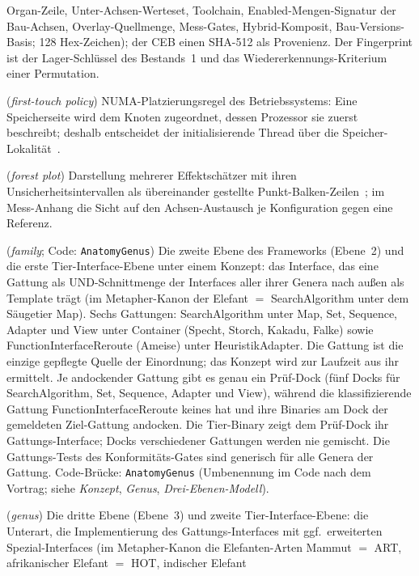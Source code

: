 \begin{description}
  Organ-Zeile, Unter-Achsen-Werteset, Toolchain, Enabled-Mengen-Signatur der Bau-Achsen,
  Overlay-Quellmenge, Mess-Gates, Hybrid-Komposit, Bau-Versions-Basis; 128 Hex-Zeichen); der CEB
  einen SHA-512 als Provenienz. Der Fingerprint ist der Lager-Schlüssel des Bestands~1 und das
  Wiedererkennungs-Kriterium einer Permutation.
  \item[First-Touch] (\emph{first-touch policy}) NUMA-Platzierungsregel des Betriebssystems: Eine
  Speicherseite wird dem Knoten zugeordnet, dessen Prozessor sie zuerst beschreibt; deshalb
  entscheidet der initialisierende Thread über die Speicher-Lokalität~\cite{lameter2013numa}.
  \item[Forest-Plot] (\emph{forest plot}) Darstellung mehrerer Effektschätzer mit ihren
  Unsicherheitsintervallen als übereinander gestellte Punkt-Balken-Zeilen~\cite{lewis2001forest};
  im Mess-Anhang die Sicht auf den Achsen-Austausch je Konfiguration gegen eine Referenz.
  \item[Gattung] (\emph{family}; Code: \texttt{AnatomyGenus}) Die zweite Ebene des Frameworks
  (Ebene~2) und die erste Tier-Interface-Ebene unter einem Konzept: das Interface, das eine Gattung als
  UND-Schnittmenge der Interfaces aller ihrer Genera nach außen als Template trägt (im Metapher-Kanon
  der Elefant $=$ SearchAlgorithm unter dem Säugetier Map). Sechs Gattungen: SearchAlgorithm unter
  Map, Set, Sequence, Adapter und View unter Container (Specht, Storch, Kakadu, Falke) sowie
  FunctionInterfaceReroute (Ameise) unter HeuristikAdapter. Die Gattung ist die einzige gepflegte
  Quelle der Einordnung; das Konzept wird zur Laufzeit aus ihr ermittelt. Je andockender Gattung gibt
  es genau ein Prüf-Dock (fünf Docks für SearchAlgorithm, Set, Sequence, Adapter und View), während
  die klassifizierende Gattung FunctionInterfaceReroute keines hat und ihre Binaries am Dock der
  gemeldeten Ziel-Gattung andocken. Die Tier-Binary zeigt dem Prüf-Dock ihr Gattungs-Interface; Docks
  verschiedener Gattungen werden nie gemischt. Die Gattungs-Tests des Konformitäts-Gates sind generisch für alle
  Genera der Gattung. Code-Brücke: \texttt{AnatomyGenus} (Umbenennung im Code nach dem Vortrag; siehe
  \emph{Konzept}, \emph{Genus}, \emph{Drei-Ebenen-Modell}).
  \item[Genus] (\emph{genus}) Die dritte Ebene (Ebene~3) und zweite Tier-Interface-Ebene: die
  Unterart, die Implementierung des Gattungs-Interfaces mit ggf.\ erweiterten Spezial-Interfaces (im
  Metapher-Kanon die Elefanten-Arten Mammut $=$ ART, afrikanischer Elefant $=$ HOT, indischer Elefant

\end{description}
